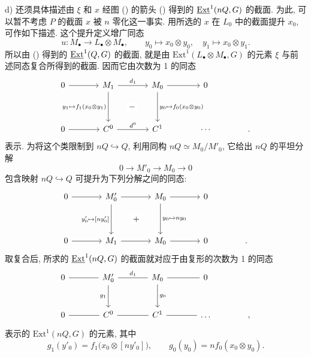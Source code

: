 \medskip
\noindent d) 还须具体描述由 $\xi$ 和 $x$ 经图 () 的箭头 () 得到的 $\uExt^1(nQ,G)$ 的截面. 为此, 可以暂不考虑 $P$ 的截面 $x$ 被 $n$ 零化这一事实. 用所选的 $x$ 在 $L_0$ 中的截面提升 $x_0$, 可作如下描述. 这个提升定义增广同态
\[
 u:M_\bullet\longrightarrow L_\bullet\otimes M_\bullet,
 \qquad
 y_0\longmapsto x_0\otimes y_0,
 \quad
 y_1\longmapsto x_0\otimes y_1.
\]
所以由 () 得到的 $\uExt^1(Q,G)$ 的截面, 就是由 $\mathrm{Ext}^1(L_\bullet\otimes M_\bullet,G)$ 的元素 $\xi$ 与前述同态复合所得到的截面. 因而它由次数为 1 的同态
\[
\begin{tikzcd}[column sep=large,row sep=huge]
 0\arrow[r]&M_1\arrow[r,"d_1"]
   \arrow[d,"{y_1\mapsto f_1(x_0\otimes y_1)}"']
   \arrow[rd,phantom,"-" description]
   &M_0\arrow[r]\arrow[d,"{y_0\mapsto f_0(x_0\otimes y_0)}"]&0\\
 0\arrow[r]&C^0\arrow[r,"d^0"]&C^1&\cdots&{.}
\end{tikzcd}
\]
表示. 为将这个类限制到 $nQ\hookrightarrow Q$, 利用同构 $nQ\simeq M_0/M'_0$, 它给出 $nQ$ 的平坦分解
\[
 0\longrightarrow M'_0\longrightarrow M_0\longrightarrow0
\]
包含映射 $nQ\hookrightarrow Q$ 可提升为下列分解之间的同态:
\[
\begin{tikzcd}[column sep=large,row sep=huge]
 0\arrow[r]&M'_0\arrow[r]
   \arrow[d,"{y'_0\mapsto[ny'_0]}"']
   \arrow[rd,phantom,"+" description]
   &M_0\arrow[r]\arrow[d,"{y_0\mapsto ny_0}"]&0\\
 0\arrow[r]&M_1\arrow[r]&M_0\arrow[r]&0&{.}
\end{tikzcd}
\]
取复合后, 所求的 $\uExt^1(nQ,G)$ 的截面就对应于由复形的次数为 1 的同态
\[
\begin{tikzcd}[column sep=large,row sep=large]
 0\arrow[r,dash]&M'_0\arrow[r,dash,"d_1"]\arrow[d,"g_1"']
   &M_0\arrow[r,dash]\arrow[d,"g_0"]&0&{}\\
 0\arrow[r,dash]&C^0\arrow[r,dash]&C^1\arrow[r,dash]&\dots&{,}
\end{tikzcd}
\]
表示的 $\mathrm{Ext}^1(nQ,G)$ 的元素, 其中
\[
 g_1(y'_0)=f_1\bigl(x_0\otimes[ny'_0]\bigr),
 \qquad
 g_0(y_0)=n f_0(x_0\otimes y_0).
\]

